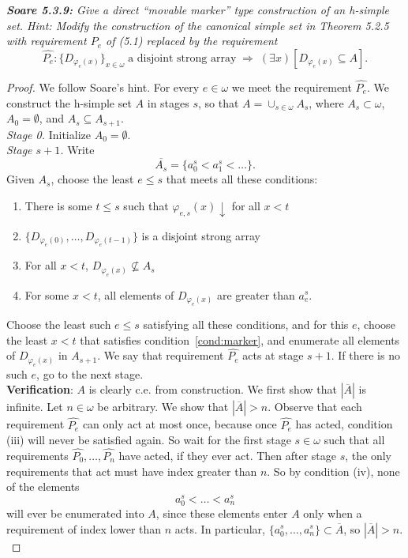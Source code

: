 \documentclass{article}
\begin{document}
\it \textbf{Soare 5.3.9:} Give a direct ``movable marker'' type
  construction of an h-simple set. Hint: Modify the construction of the
  canonical simple set in Theorem 5.2.5 with requirement $P_e$ of (5.1)
  replaced by the requirement
  \[\hat{P_e}: \{D_{\varphi_e(x)}\}_{x\in\omega}\; \text{a disjoint strong
  array}\; \Rightarrow\; (\exists x)[D_{\varphi_e(x)} \subseteq A].\]

  \begin{proof}
    We follow Soare's hint. For every $e\in\omega$ we meet the requirement
    $\hat{P_e}$. We construct the h-simple set $A$ in stages $s$, so that
    $A=\cup_{s\in\omega} A_s$, where $A_s\subset\omega$, $A_0=\emptyset$,
    and $A_s\subseteq A_{s+1}$. \\

    \textit{Stage 0.} Initialize $A_0=\emptyset$. \\

    \textit{Stage $s+1$.} Write
    \[\overline{A_s}=\{a_0^s<a_1^s<\ldots\}.\]
    Given $A_s$, choose the least $e\leq s$ that meets all these
    conditions:

    \begin{enumerate}[label={(\roman*)}]
      \item There is some $t\leq s$ such that $\varphi_{e,s}(x)\downarrow$
        for all $x<t$
      \item $\{D_{\varphi_{e}(0)}, \ldots, D_{\varphi_{e}(t-1)}\}$ is a
        disjoint strong array
      \item For all $x<t$, $D_{\varphi_{e}(x)}\not\subseteq A_s$
      \item For some $x<t$, all elements of $D_{\varphi_{e}(x)}$ are
        greater than $a_e^s$.
        \label{cond:marker}
    \end{enumerate}

    Choose the least such $e\leq s$ satisfying all these conditions, and
    for this $e$, choose the least $x<t$ that satisfies
    condition~\ref{cond:marker}, and enumerate all elements of
    $D_{\varphi_{e}(x)}$ in $A_{s+1}$. We say that requirement $\hat{P_e}$
    acts at stage $s+1$. If there is no such $e$, go to the next stage. \\

    \textbf{Verification}: $A$ is clearly c.e. from construction. We first
    show that $|\overline{A}|$ is infinite. Let $n\in\omega$ be arbitrary.
    We show that $|\overline{A}|>n$. Observe that each requirement
    $\hat{P_e}$ can only act at most once, because once $\hat{P_e}$ has
    acted, condition (iii) will never be satisfied again. So wait for the
    first stage $s\in\omega$ such that all requirements
    $\hat{P_0},\ldots,\hat{P_{n}}$ have acted, if they ever act. Then after
    stage $s$, the only requirements that act must have index greater than
    $n$. So by condition (iv), none of the elements
    \[a_0^s<\ldots<a_n^s\]
    will ever be enumerated into $A$, since these elements enter $A$ only
    when a requirement of index lower than $n$ acts. In particular,
    $\{a_0^s,\ldots,a_n^s\} \subset \overline{A}$, so $|\overline{A}|>n$.
    \\


\end{proof}
\end{document}
